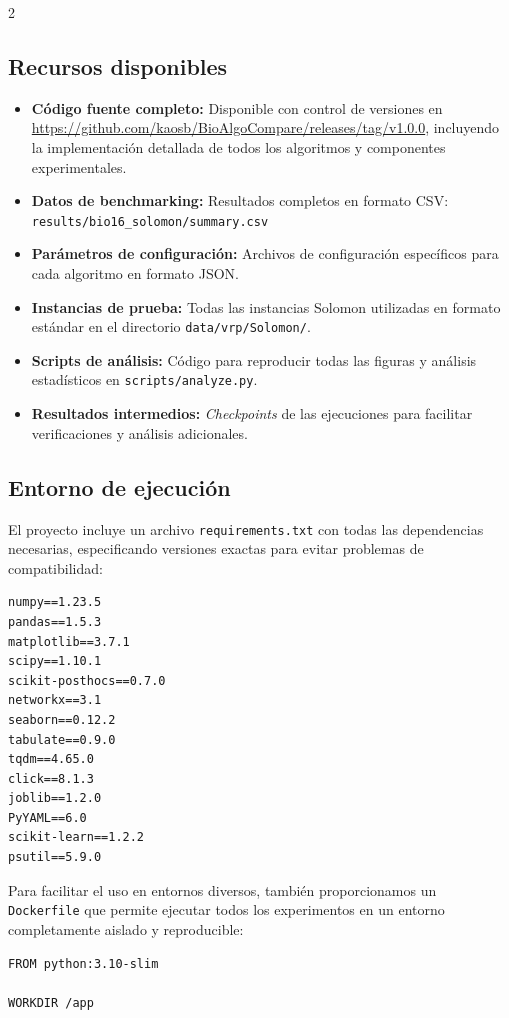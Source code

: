 \documentclass[10pt,a4paper]{extarticle}
\begin{document}
\begin{multicols}{2}
\subsection{Recursos disponibles}
\begin{itemize}
\item \textbf{Código fuente completo:} Disponible con control de versiones en \url{https://github.com/kaosb/BioAlgoCompare/releases/tag/v1.0.0}, incluyendo la implementación detallada de todos los algoritmos y componentes experimentales.
\item \textbf{Datos de benchmarking:} Resultados completos en formato CSV: \texttt{results/bio16\_solomon/summary.csv}
\item \textbf{Parámetros de configuración:} Archivos de configuración específicos para cada algoritmo en formato JSON.
\item \textbf{Instancias de prueba:} Todas las instancias Solomon utilizadas en formato estándar en el directorio \texttt{data/vrp/Solomon/}.
\item \textbf{Scripts de análisis:} Código para reproducir todas las figuras y análisis estadísticos en \texttt{scripts/analyze.py}.
\item \textbf{Resultados intermedios:} \textit{Checkpoints} de las ejecuciones para facilitar verificaciones y análisis adicionales.
\end{itemize}

\subsection{Entorno de ejecución}
El proyecto incluye un archivo \texttt{requirements.txt} con todas las dependencias necesarias, especificando versiones exactas para evitar problemas de compatibilidad:
\begin{lstlisting}
numpy==1.23.5
pandas==1.5.3
matplotlib==3.7.1
scipy==1.10.1
scikit-posthocs==0.7.0
networkx==3.1
seaborn==0.12.2
tabulate==0.9.0
tqdm==4.65.0
click==8.1.3
joblib==1.2.0
PyYAML==6.0
scikit-learn==1.2.2
psutil==5.9.0
\end{lstlisting}

Para facilitar el uso en entornos diversos, también proporcionamos un \texttt{Dockerfile} que permite ejecutar todos los experimentos en un entorno completamente aislado y reproducible:
\begin{lstlisting}
FROM python:3.10-slim

WORKDIR /app


\end{lstlisting}
\end{multicols}
\end{document}
